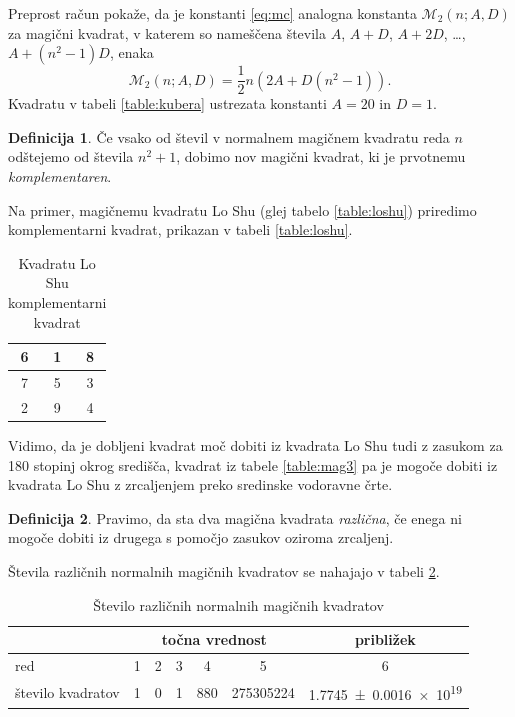 \documentclass[a4paper,12pt]{article}
\newcommand{\pojem}[1]{\emph{\color{purple}#1}}
\newcommand{\m}{\mathcal{M}_2}
\theoremstyle{definition}
\newtheorem{definicija}{Definicija}
\theoremstyle{plain}
\begin{document}
Preprost račun pokaže, da je konstanti \eqref{eq:mc} analogna konstanta
\(\m(n;A,D)\) za magični kvadrat, v katerem so nameščena števila
\(A\), \(A+D\), \(A+2D\), \ldots, \(A+(n^2-1)D\), enaka
\[
   \m(n;A,D) = \frac{1}{2} n \left(2A+D(n^2-1)\right).
\]
Kvadratu v tabeli \ref{table:kubera} ustrezata konstanti \(A=20\) in \(D=1\). %

\begin{definicija}
   Če vsako od števil v normalnem magičnem kvadratu reda \(n\) odštejemo
   od števila \(n^2+1\), dobimo nov magični kvadrat, ki je prvotnemu
   \pojem{komplementaren}.
\end{definicija}

Na primer, magičnemu kvadratu Lo Shu (glej tabelo \ref{table:loshu}) priredimo
komplementarni kvadrat, prikazan v tabeli \ref{table:loshu}. %
%
\begin{table}[!ht]
   \centering
   \caption{Kvadratu Lo Shu komplementarni kvadrat}
   \label{table:komplement}
   \begin{tabular}{|c|c|c|}
      \hline
      6 & 1 & 8 \\ \hline
      7 & 5 & 3 \\ \hline
      2 & 9 & 4 \\ \hline
   \end{tabular}
\end{table}
Vidimo, da je dobljeni kvadrat moč dobiti iz kvadrata Lo Shu tudi z zasukom za
180 stopinj okrog središča, kvadrat iz tabele \ref{table:mag3} pa je mogoče dobiti
iz kvadrata Lo Shu z zrcaljenjem preko sredinske vodoravne črte. %

\begin{definicija}
   Pravimo, da sta dva magična kvadrata \pojem{različna}, če enega ni mogoče dobiti
   iz drugega s pomočjo zasukov oziroma zrcaljenj.
\end{definicija}

Števila različnih normalnih magičnih kvadratov se nahajajo v tabeli \ref{table:stevila}.

\begin{table}[!ht]
   \centering
   \caption{Število različnih normalnih magičnih kvadratov}
   \label{table:stevila}
   \begin{tabular}{lcccccc}\toprule
      & \multicolumn{5}{c}{točna vrednost} & približek \\
      \midrule
      red & 1 & 2 & 3 & 4 & 5 & 6 \\
      število kvadratov & 1 & 0 & 1 & 880 & \num{275305224} & \num[separate-uncertainty]{1.7745 \pm 0.0016 e19} \\
      \bottomrule
   \end{tabular}
\end{table}
\end{document}
